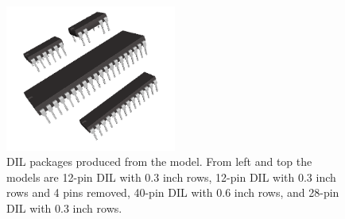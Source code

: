 \begin{figure}
\label{fig:k3ddipn}
\centering
\includegraphics[width = 0.5\textwidth]{img/k3ddipn.png}
\caption{DIL packages produced from the model. From left and top
the models are 12-pin DIL with 0.3 inch rows, 12-pin DIL
with 0.3 inch rows and 4 pins removed, 40-pin DIL with 0.6 inch
rows, and 28-pin DIL with 0.3 inch rows.}
\end{figure}


